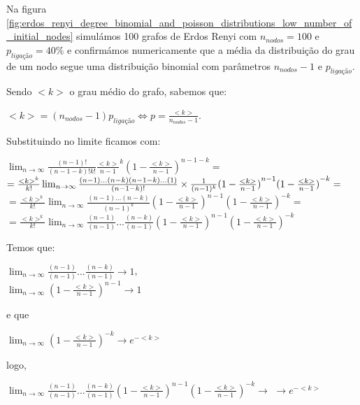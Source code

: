 \documentclass[conference, twocolumn]{IEEEtran}
\theoremstyle{plain}
\theoremstyle{definition}
\theoremstyle{remark}
\begin{document}
Na figura \ref{fig:erdos_renyi_degree_binomial_and_poisson_distributions_low_number_of_initial_nodes} simulámos 100 grafos de Erdos Renyi com $n_{nodos}=100$ e $p_{ligação}=40\%$ e confirmámos numericamente que a média da distribuição do grau de um nodo segue uma distribuição binomial com parâmetros $n_{nodos}-1$ e $p_{ligação}$.

Sendo $<k>$ o grau médio do grafo, sabemos que:
\begin{center}
$<k>=(n_{nodos}-1)p_{ligação} \Leftrightarrow p=\frac{<k>}{n_{nodos}-1}$.
\end{center}

Substituindo no limite ficamos com:

\begin{center}
$\lim_{n\rightarrow \infty} \frac{(n-1)!}{(n-1-k)!k!}{\frac{<k>}{n-1}}^{k}{(1-\frac{<k>}{n-1})}^{n-1-k} =$\\
$= \frac{<k>^k}{k!} \lim_{n\rightarrow \infty} \frac{(n-1)...(n-k)(n-1-k)...(1)}{(n-1-k)!}
\\ \times \frac{1}{(n-1)^k}
{(1-\frac{<k>}{n-1})}^{n-1}{(1-\frac{<k>}{n-1})}^{-k} = $\\

 $=  \frac{<k>^k}{k!} \lim_{n\rightarrow \infty} \frac{(n-1)...(n-k)}{(n-1)^k} {(1-\frac{<k>}{n-1})}^{n-1}{(1-\frac{<k>}{n-1})}^{-k} =$\\

$=  \frac{<k>^k}{k!} \lim_{n\rightarrow \infty} \frac{(n-1)}{(n-1)}{...}\frac{(n-k)}{(n-1)}{(1-\frac{<k>}{n-1})}^{n-1}{(1-\frac{<k>}{n-1})}^{-k} $\\
\end{center}

Temos que:
\begin{center}
$ \lim_{n\rightarrow \infty} \frac{(n-1)}{(n-1)} {...}\frac{(n-k)}{(n-1)} \rightarrow 1$, \\
$\lim_{n\rightarrow \infty}{(1-\frac{<k>}{n-1})}^{n-1} \rightarrow 1$
\end{center}

e que
\begin{center}

$ \lim_{n\rightarrow \infty}{(1-\frac{<k>}{n-1})}^{-k} \rightarrow e^{-<k>}$\\
\end{center}

logo,\\

\begin{left}
$ \lim_{n\rightarrow \infty} \frac{(n-1)}{(n-1)}{...}\frac{(n-k)}{(n-1)}{(1-\frac{<k>}{n-1})}^{n-1}{(1-\frac{<k>}{n-1})}^{-k} \rightarrow$ $\rightarrow e^{-<k>}$
\\
\end{left}
\end{document}
